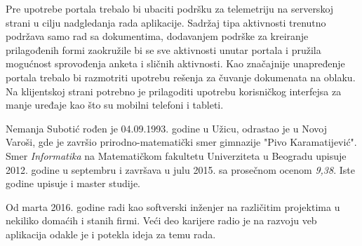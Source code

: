 \documentclass[12pt,oneside]{memoir}
\begin{document}
Pre upotrebe portala trebalo bi ubaciti podršku za telemetriju na serverskoj strani
u cilju nadgledanja rada aplikacije. 
Sadržaj tipa aktivnosti trenutno podržava samo rad sa dokumentima, dodavanjem podrške za
kreiranje prilagođenih formi zaokružile bi se sve aktivnosti unutar portala i pružila
mogućnost sprovođenja anketa i sličnih aktivnosti.
Kao značajnije unapređenje portala trebalo bi razmotriti
upotrebu rešenja za čuvanje dokumenata na oblaku. Na klijentskoj strani potrebno je
prilagoditi upotrebu korisničkog interfejsa za manje uređaje kao što su mobilni telefoni i tableti.

\literatura


\backmatter

\begin{biografija}
Nemanja Subotić rođen je 04.09.1993. godine u Užicu, odrastao je u Novoj Varoši,
gde je završio prirodno-matematički smer gimnazije "Pivo Karamatijević".
Smer \emph{Informatika} na Matematičkom fakultetu Univerziteta u Beogradu upisuje
2012. godine u septembru i završava u julu 2015. sa prosečnom ocenom \emph{9,38}.
Iste godine upisuje i master studije.

Od marta 2016. godine radi kao softverski inženjer na različitim projektima u
nekiliko domaćih i stanih firmi. Veći deo karijere radio je na razvoju veb
aplikacija odakle je i potekla ideja za temu rada.
\end{biografija}
\end{document}
